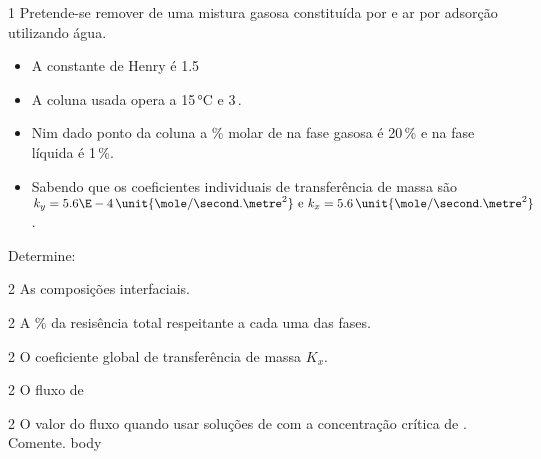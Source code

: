 \documentclass[\mainfilename]{subfiles}
\begin{document}

\begin{questionBox}1{ %
    Pretende-se remover  de uma mistura gasosa constituída por  e ar por adsorção utilizando água.
    } %
    \begin{itemize}
        \item A constante de Henry é 1.5\,\unit{\atm}
        \item A coluna usada opera a 15\,\unit{\celsius} e 3\,\unit{\atm}.
        \item Nim dado ponto da coluna a \% molar de  na fase gasosa é 20\,\unit{\percent} e na fase líquida é 1\,\unit{\percent}.
        \item Sabendo que os coeficientes individuais de transferência de massa são \(k_y=5.6\E-4\,\unit{\mole/\second.\metre^2}\text{ e }k_x=5.6\,\unit{\mole/\second.\metre^2}\).
    \end{itemize}
    Determine:

    \begin{questionBox}2{ %
        As composições interfaciais.
    } %
    \end{questionBox}

    \begin{questionBox}2{ %
        A \% da resisência total respeitante a cada uma das fases.
    } %
    \end{questionBox}

    \begin{questionBox}2{ %
        O coeficiente global de transferência de massa \(K_x\).
    } %
    \end{questionBox}

    \begin{questionBox}2{ %
        O fluxo de 
    } %
    \end{questionBox}

    \begin{questionBox}2{ %
        O valor do fluxo quando usar soluções de  com a concentração crítica de . Comente.
    } %
        body
    \end{questionBox}
\end{questionBox}
\end{document}
